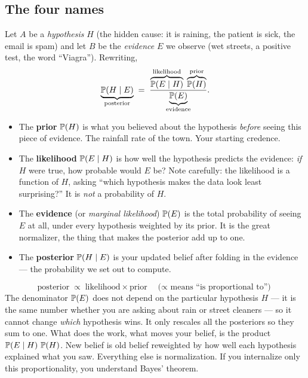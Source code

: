 \subsection{The four names}

Let $A$ be a \emph{hypothesis} $H$ (the hidden cause: it is raining, the patient is
sick, the email is spam) and let $B$ be the \emph{evidence} $E$ we observe (wet
streets, a positive test, the word ``Viagra''). Rewriting,
\begin{equation}
  \underbrace{\P(H \given E)}_{\text{posterior}}
  \;=\;
  \frac{\overbrace{\P(E \given H)}^{\text{likelihood}}\;\overbrace{\P(H)}^{\text{prior}}}
       {\underbrace{\P(E)}_{\text{evidence}}}.
  \label{ch05:bayes-named}
\end{equation}

\begin{itemize}
\item The \textbf{prior} $\P(H)$ is what you believed about the hypothesis \emph{before}
seeing this piece of evidence. The rainfall rate of the town. Your starting credence.
\item The \textbf{likelihood} $\P(E \given H)$ is how well the hypothesis predicts the
evidence: \emph{if} $H$ were true, how probable would $E$ be? Note carefully: the
likelihood is a function of $H$, asking ``which hypothesis makes the data look least
surprising?'' It is \emph{not} a probability of $H$.
\item The \textbf{evidence} (or \emph{marginal likelihood}) $\P(E)$ is the total
probability of seeing $E$ at all, under every hypothesis weighted by its prior. It is
the great normalizer, the thing that makes the posterior add up to one.
\item The \textbf{posterior} $\P(H \given E)$ is your updated belief after folding in the
evidence --- the probability we set out to compute.
\end{itemize}

\begin{happeningbox}
\[
  \text{posterior} \;\propto\; \text{likelihood} \times \text{prior} \quad \text{($\propto$ means ``is proportional to'')}
\]
The denominator $\P(E)$ does not depend on the particular hypothesis $H$ --- it is the
same number whether you are asking about rain or street cleaners --- so it cannot change
\emph{which} hypothesis wins. It only rescales all the posteriors so they sum to one.
What does the work, what moves your belief, is the product
$\P(E\given H)\,\P(H)$. New belief is old belief reweighted by how well each hypothesis
explained what you saw. Everything else is normalization. If you internalize only
this proportionality, you understand Bayes' theorem.
\end{happeningbox}

